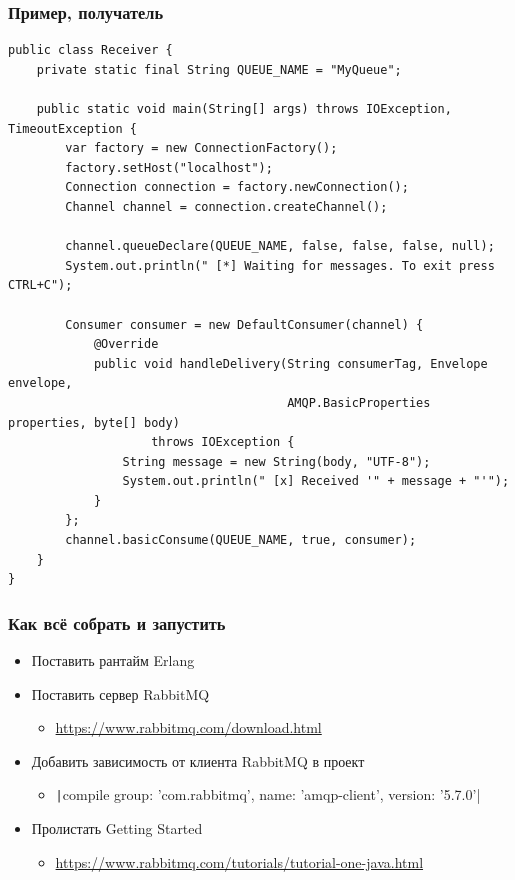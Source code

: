 \documentclass[xetex,mathserif,serif]{beamer}
\begin{document}
	\begin{frame}[fragile]
		\frametitle{Пример, получатель}
		\begin{ssmall}
			\begin{verbatim}
public class Receiver {
    private static final String QUEUE_NAME = "MyQueue";

    public static void main(String[] args) throws IOException, TimeoutException {
        var factory = new ConnectionFactory();
        factory.setHost("localhost");
        Connection connection = factory.newConnection();
        Channel channel = connection.createChannel();

        channel.queueDeclare(QUEUE_NAME, false, false, false, null);
        System.out.println(" [*] Waiting for messages. To exit press CTRL+C");

        Consumer consumer = new DefaultConsumer(channel) {
            @Override
            public void handleDelivery(String consumerTag, Envelope envelope,
                                       AMQP.BasicProperties properties, byte[] body)
                    throws IOException {
                String message = new String(body, "UTF-8");
                System.out.println(" [x] Received '" + message + "'");
            }
        };
        channel.basicConsume(QUEUE_NAME, true, consumer);
    }
}
			\end{verbatim}
		\end{ssmall}
	\end{frame}

	\begin{frame}
		\frametitle{Как всё собрать и запустить}
		\begin{itemize}
			\item Поставить рантайм Erlang
			\item Поставить сервер RabbitMQ
			\begin{itemize}
				\item \url{https://www.rabbitmq.com/download.html}
			\end{itemize}
			\item Добавить зависимость от клиента RabbitMQ в проект
			\begin{itemize}
				\item \texttt|compile group: 'com.rabbitmq', name: 'amqp-client', version: '5.7.0'|
			\end{itemize}
			\item Пролистать Getting Started 
			\begin{itemize}
				\item \url{https://www.rabbitmq.com/tutorials/tutorial-one-java.html}
			\end{itemize}
		\end{itemize}
	\end{frame}
\end{document}
